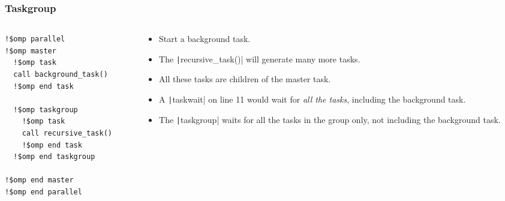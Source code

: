 \documentclass{beamer}
\begin{document}
\begin{frame}[fragile]
\frametitle{Taskgroup}
\begin{columns}
\begin{column}{.5\textwidth}
\begin{verbatim}
!$omp parallel
!$omp master
  !$omp task
  call background_task()
  !$omp end task

  !$omp taskgroup
    !$omp task
    call recursive_task()
    !$omp end task
  !$omp end taskgroup

!$omp end master
!$omp end parallel
\end{verbatim}
\end{column}

\begin{column}{.5\textwidth}
\begin{itemize}
  \item Start a background task.
  \item The \texttt|recursive_task()| will generate many more tasks.
  \item All these tasks are children of the master task.
  \item A \texttt|taskwait| on line 11 would wait for \emph{all the tasks}, including the background task.
  \item The \texttt|taskgroup| waits for all the tasks in the group only, not including the background task.
\end{itemize}
\end{column}
\end{columns}

\end{frame}

\end{document}
